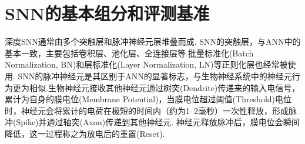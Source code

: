 \documentclass{SCIS2020cn}
\begin{document}
\section{SNN的基本组分和评测基准}
深度SNN通常由多个突触层和脉冲神经元层堆叠而成.
SNN的突触层，与ANN中的基本一致，主要包括卷积层、池化层、全连接层等.批量标准化(Batch Normalization, BN)\cite{ioffe2015batch}和层标准化(Layer Normalization, LN)\cite{ba2016layer}等正则化层也经常被使用.
SNN的脉冲神经元是其区别于ANN的显著标志，与生物神经系统中的神经元行为更为相似.生物神经元接收其他神经元通过树突(Dendrite)传递来的输入电信号，累计为自身的膜电位(Membrane Potential)，当膜电位超过阈值(Threshold)电位时，神经元会将累计的电荷在极短的时间内（约为1--2毫秒）一次性释放，形成脉冲(Spike)并通过轴突(Axon)传递到其他神经元.
神经元释放脉冲后，膜电位会瞬间降低，这一过程称之为放电后的重置(Reset).
\end{document}
